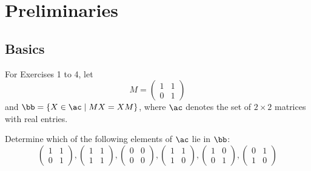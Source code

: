 \setcounter{section}{-1}

\section{Preliminaries}

\subsection{Basics}

For Exercises 1 to 4, let
\[
M = 
\begin{pmatrix}
    1 & 1 \\
    0 & 1
\end{pmatrix}
\]
and $\bb = \{X \in \ac \mid MX = XM\}$, where $\ac$ denotes the set of $2 \times 2$ matrices with real entries.

\begin{exercise}\label{ex0.1.1}
    Determine which of the following elements of $\ac$ lie in $\bb$:
    \[
    \begin{pmatrix}
        1 & 1 \\
        0 & 1
    \end{pmatrix},
    \begin{pmatrix}
        1 & 1 \\
        1 & 1
    \end{pmatrix},
    \begin{pmatrix}
        0 & 0 \\
        0 & 0
    \end{pmatrix},
    \begin{pmatrix}
        1 & 1 \\
        1 & 0
    \end{pmatrix},
    \begin{pmatrix}
        1 & 0 \\
        0 & 1
    \end{pmatrix},
    \begin{pmatrix}
        0 & 1 \\
        1 & 0 
    \end{pmatrix}
    \]
\end{exercise}

